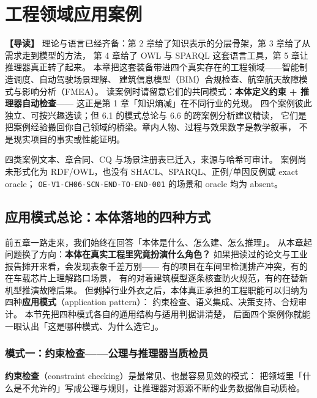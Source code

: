 \chapter{工程领域应用案例}

\begin{introbox}
\textbf{【导读】}
理论与语言已经齐备：第 2 章给了知识表示的分层骨架，第 3 章给了从需求走到模型的方法，
第 4 章给了 OWL 与 SPARQL 这套语言工具，第 5 章让推理器真正转了起来。
本章把这套装备带进四个真实存在的工程领域——智能制造调度、自动驾驶场景理解、
建筑信息模型（BIM）合规检查、航空航天故障模式与影响分析（FMEA）。
读案例时请留意它们的共同模式：\textbf{本体定义约束 + 推理器自动检查}——
这正是第 1 章「知识熵减」在不同行业的兑现。
四个案例彼此独立、可按兴趣选读；但 6.1 的模式总论与 6.6 的跨案例分析建议精读，
它们是把案例经验搬回你自己领域的桥梁。章内人物、过程与效果数字是教学叙事，
不是现实项目的事实或性能证明。
\end{introbox}

{四类案例文本、章合同、CQ 与场景注册表已迁入，来源与哈希可审计。}
{案例尚未形式化为 RDF/OWL，也没有 SHACL、SPARQL、正例/单因反例或 exact oracle；
\texttt{OE-V1-CH06-SCN-END-TO-END-001} 的场景和 oracle 均为 absent。}

\section{应用模式总论：本体落地的四种方式}

前五章一路走来，我们始终在回答「本体是什么、怎么建、怎么推理」。
从本章起问题换了方向：\textbf{本体在真实工程里究竟扮演什么角色？}
如果把读过的论文与工业报告摊开来看，会发现表象千差万别——
有的项目在车间里检测排产冲突，有的在车载芯片上理解路口场景，
有的对着建筑模型逐条核查防火规范，有的在替新机型推演故障后果。
但剥掉行业外衣之后，本体真正承担的工程职能可以归纳为四种\textbf{应用模式}（application pattern）：
约束检查、语义集成、决策支持、合规审计。
本节先把四种模式各自的通用结构与适用判据讲清楚，
后面四个案例你就能一眼认出「这是哪种模式、为什么选它」。

\subsection{模式一：约束检查——公理与推理器当质检员}

\textbf{约束检查}（constraint checking）是最常见、也最容易见效的模式：
把领域里「什么是不允许的」写成公理与规则，让推理器对源源不断的业务数据做自动质检。

